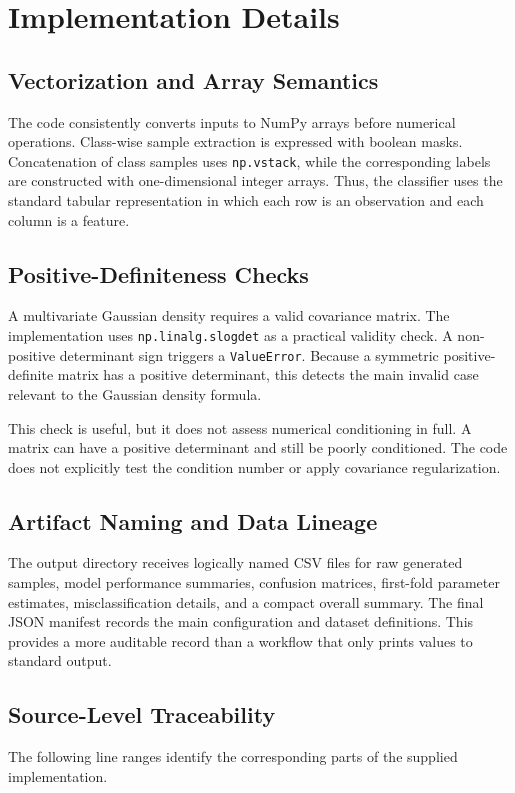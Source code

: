 \documentclass[11pt,a4paper]{article}
\newcommand{\code}[1]{\texttt{#1}}
\begin{document}
\section{Implementation Details}

\subsection{Vectorization and Array Semantics}
The code consistently converts inputs to NumPy arrays before numerical operations. Class-wise sample extraction is expressed with boolean masks. Concatenation of class samples uses \code{np.vstack}, while the corresponding labels are constructed with one-dimensional integer arrays. Thus, the classifier uses the standard tabular representation in which each row is an observation and each column is a feature.

\subsection{Positive-Definiteness Checks}
A multivariate Gaussian density requires a valid covariance matrix. The implementation uses \code{np.linalg.slogdet} as a practical validity check. A non-positive determinant sign triggers a \code{ValueError}. Because a symmetric positive-definite matrix has a positive determinant, this detects the main invalid case relevant to the Gaussian density formula.

This check is useful, but it does not assess numerical conditioning in full. A matrix can have a positive determinant and still be poorly conditioned. The code does not explicitly test the condition number or apply covariance regularization.

\subsection{Artifact Naming and Data Lineage}
The output directory receives logically named CSV files for raw generated samples, model performance summaries, confusion matrices, first-fold parameter estimates, misclassification details, and a compact overall summary. The final JSON manifest records the main configuration and dataset definitions. This provides a more auditable record than a workflow that only prints values to standard output.

\subsection{Source-Level Traceability}
The following line ranges identify the corresponding parts of the supplied implementation.
\end{document}
